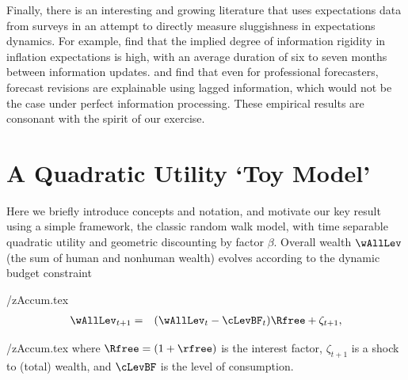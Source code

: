 Finally, there is an interesting and growing literature that uses expectations data from surveys in an attempt to directly measure sluggishness in expectations dynamics.
For example, \cite{coibGor:AER15} find that the implied degree of information rigidity in inflation expectations is high, with an average duration of six to seven months between information updates. \cite{fuhrer:JME17} and \cite{fuhrerIntrinsicPersistence} find that even for professional forecasters, forecast revisions are explainable using lagged information, which would not be the case under perfect information processing.  These empirical results are consonant with the spirit of our exercise.

\hypertarget{Quadratic}{}
\section{A Quadratic Utility `Toy Model'}\label{sec:Quadratic}

Here we briefly introduce concepts and notation, and motivate our key result using a simple framework, the classic \cite{hallRandomWalk} random walk model, with time separable quadratic utility and geometric discounting by factor $\beta$.  Overall wealth $\wAllLev$ (the sum of human and nonhuman wealth) evolves according to the dynamic budget constraint
\begin{verbatimwrite}{\eq/zAccum.tex}
  \begin{eqnarray}
    \wAllLev_{t+1} & = & (\wAllLev_{t}-\cLevBF_{t})\Rfree+\zeta_{t+1}, \label{eq:zAccum}
  \end{eqnarray}
\end{verbatimwrite}
 \eq/zAccum.tex
where $\Rfree=(1+\rfree)$ is the interest factor, $\zeta_{t+1}$ is a shock to (total) wealth, and $\cLevBF$ is the level of consumption.

